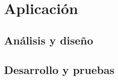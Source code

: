 \chapter{Aplicación}
\label{ch:aplicación}



\section{Análisis y diseño}
\label{secc:análisis y diseño}

\newpage
\section{Desarrollo y pruebas}

\label{secc:desarrollo y pruebas}






















